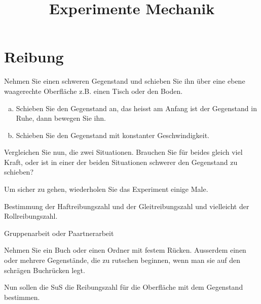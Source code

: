\documentclass[12pt,a4paper,twoside]{article}
\title{Experimente Mechanik}
\date{}
\begin{document}
\maketitle

\tableofcontents

\section{Reibung}
\begin{aufgabe}
	
Nehmen Sie einen schweren Gegenstand und schieben Sie ihn über eine ebene waagerechte Oberfläche z.B. einen Tisch oder den Boden.

\begin{enumerate}[a)]
	\item Schieben Sie den Gegenstand an, das heisst am Anfang ist der Gegenstand in Ruhe, dann bewegen Sie ihn.
	\item Schieben Sie den Gegenstand mit konstanter Geschwindigkeit. 
\end{enumerate}
Vergleichen Sie nun, die zwei Situationen. Brauchen Sie für beides gleich viel Kraft, 
oder ist in einer der beiden Situationen schwerer den Gegenstand zu schieben?

Um sicher zu gehen, wiederholen Sie das Experiment einige Male.

\end{aufgabe}

\newpage

Bestimmung der Haftreibungszahl und der Gleitreibungszahl und vielleicht der Rollreibungszahl.

Gruppenarbeit oder Paartnerarbeit

Nehmen Sie ein Buch oder einen Ordner mit festem Rücken. Ausserdem einen oder mehrere Gegenstände, die zu rutschen beginnen, wenn man sie auf den schrägen
Buchrücken legt.

Nun sollen die SuS die Reibungszahl für die Oberfläche mit dem Gegenstand bestimmen.
\end{document}
